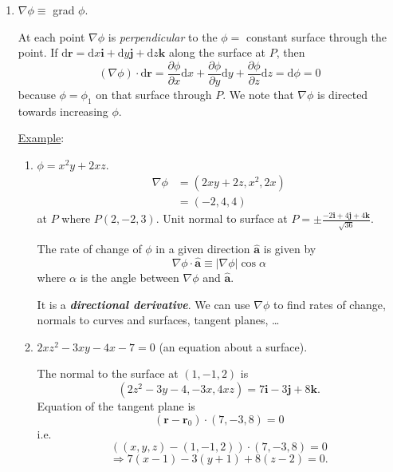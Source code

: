\documentclass[12pt]{report}
\theoremstyle{definition}
\begin{document}
\begin{enumerate}[label = (\arabic*)]
    \item $\nabla\phi\equiv$ grad $\phi$.

        At each point $\nabla\phi$ is \emph{perpendicular} to the $\phi =$ constant surface through the point.
        If $\mathrm{d}\mathbf{r} = \mathrm{d}x\mathbf{i}
        + \mathrm{d}y\mathbf{j} + \mathrm{d}z\mathbf{k}$
        along the surface at $P$, then\[
            (\nabla\phi)\cdot\mathrm{d}\mathbf{r} = 
            \frac{\partial\phi}{\partial x}\mathrm{d}x + \frac{\partial\phi}{\partial y}\mathrm{d}y
            + \frac{\partial\phi}{\partial z}\mathrm{d}z = \mathrm{d}\phi = 0
        \]because $\phi = \phi_1$ on that surface through $P$.
        We note that $\nabla\phi$ is directed towards increasing $\phi$.

        \medskip
        \underline{Example}: 

        \begin{enumerate}[label = (\alph*)]
            \item $\phi = x^{2}y + 2xz$.
                \[
                    \begin{align*}
                        \nabla\phi & = (2xy + 2z, x^{2}, 2x) \\
                                   & = (-2, 4, 4)
                    \end{align*}
                \]at $P$ where $P(2, -2, 3)$.
                Unit normal to surface at $P = \pm \frac{-2\mathbf{i} + 4\mathbf{j} + 4\mathbf{k}}{\sqrt{36}}$.
    
                The rate of change of $\phi$ in a given direction $\hat{\mathbf{a}}$
                is given by\[
                    \nabla\phi\cdot\hat{\mathbf{a}} \equiv |\nabla\phi|\cos{\alpha}
                \]where $\alpha$ is the angle between $\nabla\phi$ and $\hat{\mathbf{a}}$.
                
                It is a \textbf{\emph{directional derivative}}.
                We can use $\nabla\phi$ to find rates of change, normals to curves and surfaces, tangent planes, \ldots
    
            \item $2xz^{2} - 3xy - 4x - 7 = 0$ (an equation about a surface).

                The normal to the surface at $(1, -1, 2)$ is\[
                    (2z^{2}-3y-4, -3x, 4xz) = 7\mathbf{i} - 3\mathbf{j} + 8\mathbf{k}.
                \]
                Equation of the tangent plane is\[
                    (\mathbf{r} - \mathbf{r}_0)\cdot(7, -3, 8) = 0
                \]i.e.\ \[
                ((x, y, z) - (1, -1, 2))\cdot(7, -3, 8) = 0
                \]\[
                \Rightarrow{}7(x-1) - 3(y+1) + 8(z-2) = 0.
                \]
        \end{enumerate}
        

\end{enumerate}
\end{document}
